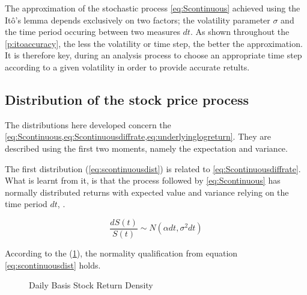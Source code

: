 \documentclass[12pt]{report}
\newcommand{\St}{S\left(t\right)}
\newcommand{\dSt}{dS\left(t\right)}
\newcommand{\dSr}{\frac{\dSt}{\St}}
\begin{document}
The approximation of the stochastic process \ref{eq:Scontinuous} achieved using the Itô's lemma depends exclusively on two factors; the volatility parameter $\sigma$ and the time period occuring between two measures $dt$. 
As shown throughout the \cref{p:itoaccuracy}, the less the volatility or time step, the better the approximation.
It is therefore key, during an analysis process to choose an appropriate time step according to a given volatility in order to provide accurate retults.


\subsection{Distribution of the stock price process}
\label{sub:Distribution of the stock price process}

The distributions here developed concern the \cref{eq:Scontinuous,eq:Scontinuousdiffrate,eq:underlyinglogreturn}. They are described using the first two moments, namely the expectation and variance.

The first distribution (\ref{eq:scontinuousdist}) is related to \cref{eq:Scontinuousdiffrate}. What is learnt from it, is that the process followed by \cref{eq:Scontinuous} has normally distributed returns with expected value and variance relying on the time period $dt$, \citet{shreve}.

\begin{center}
\begin{equation}
\dSr \sim N(\alpha dt, \sigma^2 dt)
\label{eq:scontinuousdist}
\end{equation}
\end{center}  
According to the (\cref{p:returndensity}), the normality qualification from equation \ref{eq:scontinuousdist} holds.

 
\begin{figure}[!h]
\centering

\caption{Daily Basis Stock Return Density}
\label{p:returndensity}
\end{figure}
\end{document}
